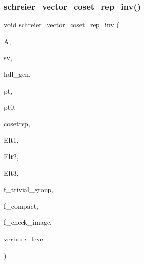 \mbox{\label{schreier__vector_8_c_ae8cfac11b7c6625bd3b00c73929fde6f}} 
\subsubsection{\texorpdfstring{schreier\+\_\+vector\+\_\+coset\+\_\+rep\+\_\+inv()}{schreier\_vector\_coset\_rep\_inv()}}
{\footnotesize\ttfamily void schreier\+\_\+vector\+\_\+coset\+\_\+rep\+\_\+inv (\begin{DoxyParamCaption}\item[{\mbox{\hyperlink{classaction}{action}} $\ast$}]{A,  }\item[{\mbox{\hyperlink{galois_8h_a09fddde158a3a20bd2dcadb609de11dc}{I\+NT}} $\ast$}]{sv,  }\item[{\mbox{\hyperlink{galois_8h_a09fddde158a3a20bd2dcadb609de11dc}{I\+NT}} $\ast$}]{hdl\+\_\+gen,  }\item[{\mbox{\hyperlink{galois_8h_a09fddde158a3a20bd2dcadb609de11dc}{I\+NT}}}]{pt,  }\item[{\mbox{\hyperlink{galois_8h_a09fddde158a3a20bd2dcadb609de11dc}{I\+NT}} \&}]{pt0,  }\item[{\mbox{\hyperlink{galois_8h_a09fddde158a3a20bd2dcadb609de11dc}{I\+NT}} $\ast$}]{cosetrep,  }\item[{\mbox{\hyperlink{galois_8h_a09fddde158a3a20bd2dcadb609de11dc}{I\+NT}} $\ast$}]{Elt1,  }\item[{\mbox{\hyperlink{galois_8h_a09fddde158a3a20bd2dcadb609de11dc}{I\+NT}} $\ast$}]{Elt2,  }\item[{\mbox{\hyperlink{galois_8h_a09fddde158a3a20bd2dcadb609de11dc}{I\+NT}} $\ast$}]{Elt3,  }\item[{\mbox{\hyperlink{galois_8h_a09fddde158a3a20bd2dcadb609de11dc}{I\+NT}}}]{f\+\_\+trivial\+\_\+group,  }\item[{\mbox{\hyperlink{galois_8h_a09fddde158a3a20bd2dcadb609de11dc}{I\+NT}}}]{f\+\_\+compact,  }\item[{\mbox{\hyperlink{galois_8h_a09fddde158a3a20bd2dcadb609de11dc}{I\+NT}}}]{f\+\_\+check\+\_\+image,  }\item[{\mbox{\hyperlink{galois_8h_a09fddde158a3a20bd2dcadb609de11dc}{I\+NT}}}]{verbose\+\_\+level }\end{DoxyParamCaption})}

